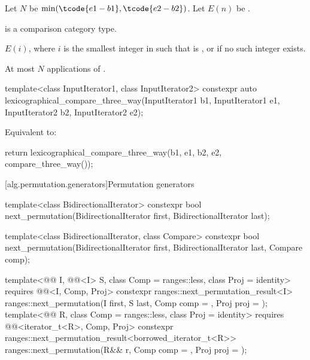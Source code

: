 \begin{itemdescr}
\pnum
Let $N$ be $\min(\tcode{e1 - b1}, \tcode{e2 - b2})$.
Let $E(n)$ be .

\pnum
\mandates
{} is a comparison category type.

\pnum
\returns
$E(i)$, where $i$ is the smallest integer in 
such that  is , or
 if no such integer exists.

\pnum
\complexity
At most $N$ applications of .
\end{itemdescr}

%
\begin{itemdecl}
template<class InputIterator1, class InputIterator2>
  constexpr auto
    lexicographical_compare_three_way(InputIterator1 b1, InputIterator1 e1,
                                      InputIterator2 b2, InputIterator2 e2);
\end{itemdecl}

\begin{itemdescr}
\pnum
\effects
Equivalent to:
\begin{codeblock}
return lexicographical_compare_three_way(b1, e1, b2, e2, compare_three_way());
\end{codeblock}
\end{itemdescr}

[alg.permutation.generators]{Permutation generators}

%
\begin{itemdecl}
template<class BidirectionalIterator>
  constexpr bool next_permutation(BidirectionalIterator first,
                                  BidirectionalIterator last);

template<class BidirectionalIterator, class Compare>
  constexpr bool next_permutation(BidirectionalIterator first,
                                  BidirectionalIterator last, Compare comp);

template<@@ I, @@<I> S, class Comp = ranges::less,
         class Proj = identity>
  requires @@<I, Comp, Proj>
  constexpr ranges::next_permutation_result<I>
    ranges::next_permutation(I first, S last, Comp comp = {}, Proj proj = {});
template<@@ R, class Comp = ranges::less,
         class Proj = identity>
  requires @@<iterator_t<R>, Comp, Proj>
  constexpr ranges::next_permutation_result<borrowed_iterator_t<R>>
    ranges::next_permutation(R&& r, Comp comp = {}, Proj proj = {});
\end{itemdecl}

